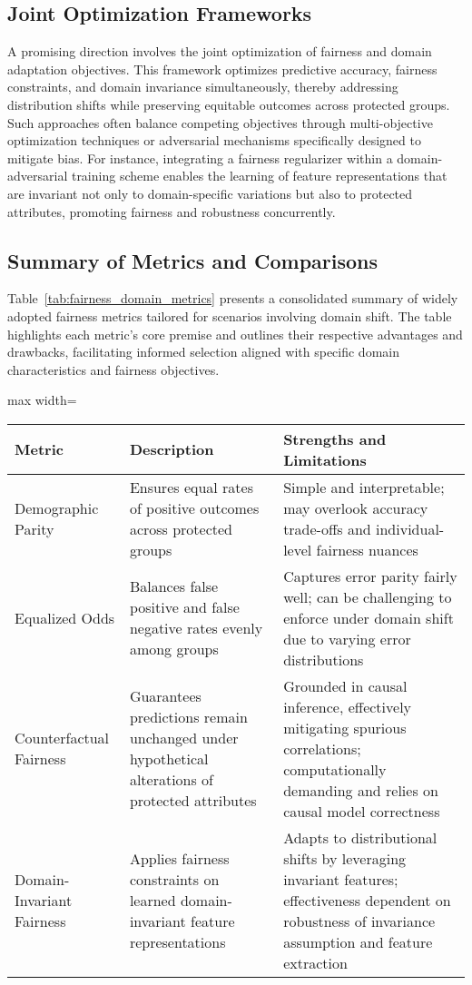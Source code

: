 \documentclass[sigconf]{acmart}
\begin{document}
\subsection{Joint Optimization Frameworks}
A promising direction involves the joint optimization of fairness and domain adaptation objectives. This framework optimizes predictive accuracy, fairness constraints, and domain invariance simultaneously, thereby addressing distribution shifts while preserving equitable outcomes across protected groups. Such approaches often balance competing objectives through multi-objective optimization techniques or adversarial mechanisms specifically designed to mitigate bias. For instance, integrating a fairness regularizer within a domain-adversarial training scheme enables the learning of feature representations that are invariant not only to domain-specific variations but also to protected attributes, promoting fairness and robustness concurrently.

\subsection{Summary of Metrics and Comparisons}
Table~\ref{tab:fairness_domain_metrics} presents a consolidated summary of widely adopted fairness metrics tailored for scenarios involving domain shift. The table highlights each metric's core premise and outlines their respective advantages and drawbacks, facilitating informed selection aligned with specific domain characteristics and fairness objectives.

\begin{table*}[htbp]
\centering
\caption{Overview of fairness metrics for domain shift scenarios}
\label{tab:fairness_domain_metrics}
\begin{adjustbox}{max width=\textwidth}
\begin{tabular}{@{}lll@{}}
\toprule
\textbf{Metric} & \textbf{Description} & \textbf{Strengths and Limitations} \\
\midrule
Demographic Parity & Ensures equal rates of positive outcomes across protected groups & Simple and interpretable; may overlook accuracy trade-offs and individual-level fairness nuances \\
Equalized Odds & Balances false positive and false negative rates evenly among groups & Captures error parity fairly well; can be challenging to enforce under domain shift due to varying error distributions \\
Counterfactual Fairness & Guarantees predictions remain unchanged under hypothetical alterations of protected attributes & Grounded in causal inference, effectively mitigating spurious correlations; computationally demanding and relies on causal model correctness \\
Domain-Invariant Fairness & Applies fairness constraints on learned domain-invariant feature representations & Adapts to distributional shifts by leveraging invariant features; effectiveness dependent on robustness of invariance assumption and feature extraction \\
\bottomrule
\end{tabular}
\end{adjustbox}
\end{table*}
\end{document}
